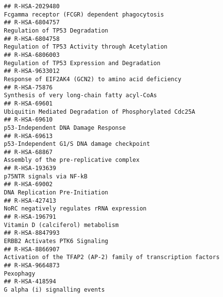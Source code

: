 \documentclass[
]{article}
\begin{document}
\begin{verbatim}
## R-HSA-2029480                                                                                       Fcgamma receptor (FCGR) dependent phagocytosis
## R-HSA-6804757                                                                                                       Regulation of TP53 Degradation
## R-HSA-6804758                                                                                      Regulation of TP53 Activity through Acetylation
## R-HSA-6806003                                                                                        Regulation of TP53 Expression and Degradation
## R-HSA-9633012                                                                                  Response of EIF2AK4 (GCN2) to amino acid deficiency
## R-HSA-75876                                                                                           Synthesis of very long-chain fatty acyl-CoAs
## R-HSA-69601                                                                                Ubiquitin Mediated Degradation of Phosphorylated Cdc25A
## R-HSA-69610                                                                                                    p53-Independent DNA Damage Response
## R-HSA-69613                                                                                             p53-Independent G1/S DNA damage checkpoint
## R-HSA-68867                                                                                                Assembly of the pre-replicative complex
## R-HSA-193639                                                                                                              p75NTR signals via NF-kB
## R-HSA-69002                                                                                                         DNA Replication Pre-Initiation
## R-HSA-427413                                                                                             NoRC negatively regulates rRNA expression
## R-HSA-196791                                                                                                     Vitamin D (calciferol) metabolism
## R-HSA-8847993                                                                                                       ERBB2 Activates PTK6 Signaling
## R-HSA-8866907                                                                       Activation of the TFAP2 (AP-2) family of transcription factors
## R-HSA-9664873                                                                                                                            Pexophagy
## R-HSA-418594                                                                                                         G alpha (i) signalling events

\end{verbatim}
\end{document}
